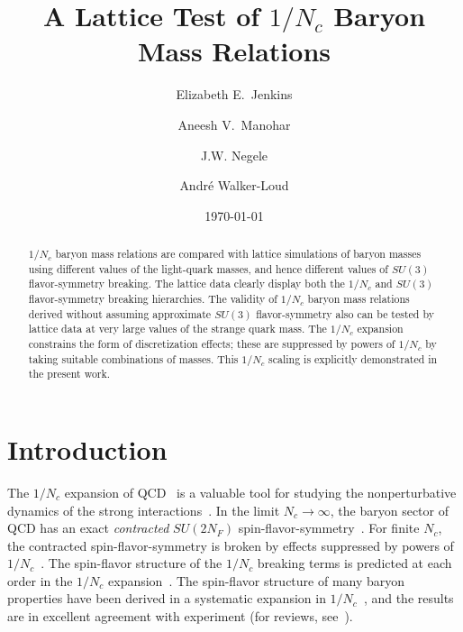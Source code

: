 \documentclass[twocolumn,nofootinbib,prd,aps,superscriptaddress,tightenlines]{revtex4}
\begin{document}
\title{A Lattice Test of $1/N_c$ Baryon Mass Relations}

\author{Elizabeth E.~Jenkins}

\author{Aneesh V.~Manohar}
  
\author{J.W. Negele}

\author{Andr\'e Walker-Loud}


\begin{abstract}
$1/N_c$ baryon mass relations are compared with lattice simulations of baryon masses using different values of the light-quark masses, and hence different values of $SU(3)$ flavor-symmetry breaking.  The lattice data clearly display both the $1/N_c$ and $SU(3)$  flavor-symmetry breaking hierarchies. The validity of $1/N_c$ baryon mass relations derived without assuming approximate $SU(3)$ flavor-symmetry also can be tested by lattice data at very large values of the strange quark mass. The $1/N_c$ expansion constrains the form of discretization effects; these are suppressed by powers of $1/N_c$ by taking suitable combinations of masses.  This $1/N_c$ scaling is explicitly demonstrated in the present work.
\end{abstract}


\date{\today\quad\hourmin}


\maketitle



%
\section{Introduction}
%

The $1/N_c$ expansion of QCD~\cite{thooft} is a valuable tool for studying the nonperturbative dynamics of the strong interactions~\cite{witten,coleman}. In the limit $N_c \rightarrow \infty$, the baryon sector of QCD has an exact {\it contracted} $SU(2N_F)$ spin-flavor-symmetry~\cite{dm}.  For finite $N_c$, the contracted spin-flavor-symmetry is broken by effects suppressed by powers of $1/N_c$~\cite{dm,j}. The spin-flavor structure of the $1/N_c$ breaking terms is predicted at each order in the $1/N_c$ expansion~\cite{dm,j,djm1}.  The spin-flavor structure of many baryon properties have been derived in a systematic expansion in $1/N_c$~\cite{luty,carone,djm2,pirjol,schat,three}, and the results are in excellent agreement with experiment (for reviews, see~\cite{ejreview,amreview}).
\end{document}
